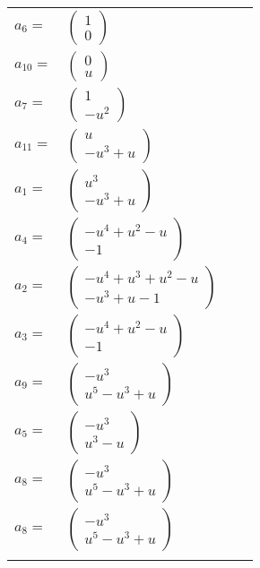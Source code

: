 \documentclass[1p]{elsarticle_modified}
\theoremstyle{definition}
\begin{document}
\begin{tabular}{m{7pt} m{180pt} m{7pt} m{180pt} }
\flushright $a_{6}=$&$\begin{pmatrix}1\\0\end{pmatrix}$ \\
\flushright $a_{10}=$&$\begin{pmatrix}0\\u\end{pmatrix}$ \\
\flushright $a_{7}=$&$\begin{pmatrix}1\\- u^2\end{pmatrix}$ \\
\flushright $a_{11}=$&$\begin{pmatrix}u\\- u^3+u\end{pmatrix}$ \\
\flushright $a_{1}=$&$\begin{pmatrix}u^3\\- u^3+u\end{pmatrix}$ \\
\flushright $a_{4}=$&$\begin{pmatrix}- u^4+u^2- u\\-1\end{pmatrix}$ \\
\flushright $a_{2}=$&$\begin{pmatrix}- u^4+u^3+u^2- u\\- u^3+u-1\end{pmatrix}$ \\
\flushright $a_{3}=$&$\begin{pmatrix}- u^4+u^2- u\\-1\end{pmatrix}$ \\
\flushright $a_{9}=$&$\begin{pmatrix}- u^3\\u^5- u^3+u\end{pmatrix}$ \\
\flushright $a_{5}=$&$\begin{pmatrix}- u^3\\u^3- u\end{pmatrix}$ \\
\flushright $a_{8}=$&$\begin{pmatrix}- u^3\\u^5- u^3+u\end{pmatrix}$\\ \flushright $a_{8}=$&$\begin{pmatrix}- u^3\\u^5- u^3+u\end{pmatrix}$\\&\end{tabular}
\end{document}
